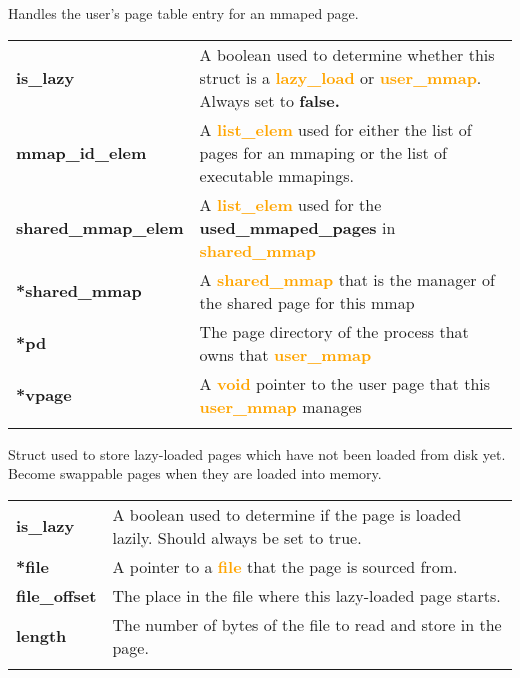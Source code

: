 \documentclass{report}
\newcommand{\file}[1]{\textcolor{YellowGreen}{\textbf{#1}}}
\newcommand{\struct}[1]{\textcolor{orange}{\textbf{#1}}}
\newcommand{\var}[1]{\textcolor{RoyalPurple}{\textbf{#1}}}
\newcommand{\const}[1]{\textcolor{BrickRed}{\textbf{#1}}}
\newcommand{\pintoscode}[4]{}
\newcommand{\pintosfile}[3]{\pintoscode{#1}{#2}{\file{#3}}{#3}}
\begin{document}
				\pintosfile{60}{67}{mmap.c}
				Handles the user's page table entry for an mmaped page. \\
				\begin{center}
					\begin{tabular}{l p{10cm}}
							\vspace*{2mm}
							\var{is\_lazy}            & A boolean used to determine whether this struct is a \struct{lazy\_load} or \struct{user\_mmap}. Always set to \const{false.} \\ \vspace*{2mm}
							\var{mmap\_id\_elem}      & A \struct{list\_elem} used for either the list of pages for an mmaping or the list of executable mmapings. \\ \vspace*{2mm}
							\var{shared\_mmap\_elem}  & A \struct{list\_elem} used for the \var{used\_mmaped\_pages} in \struct{shared\_mmap} \\ \vspace*{2mm}
							\var{*shared\_mmap}       & A \struct{shared\_mmap} that is the manager of the shared page for this mmap \\ \vspace*{2mm}
							\var{*pd}                 & The page directory of the process that owns that \struct{user\_mmap} \\ \vspace*{2mm}
							\var{*vpage}              & A \struct{void} pointer to the user page that this \struct{user\_mmap} manages \\ \vspace*{2mm}
					\end{tabular}
				\end{center}

				\pintosfile{8}{13}{lazy.c}
				Struct used to store lazy-loaded pages which have not been loaded from disk yet. Become swappable pages when
				they are loaded into memory.  \\
				\begin{center}
					\begin{tabular}{l p{10cm}}
							\vspace*{2mm}
							\var{is\_lazy}        	& A boolean used to determine if the page is loaded lazily. Should always be set to true. \\ \vspace*{2mm}
							\var{*file}      		& A pointer to a \struct{file} that the page is sourced from. \\ \vspace*{2mm}
							\var{file\_offset}  	& The place in the file where this lazy-loaded page starts. \\ \vspace*{2mm}
							\var{length}       		& The number of bytes of the file to read and store in the page. \\ \vspace*{2mm}
					\end{tabular}
				\end{center}
\end{document}
